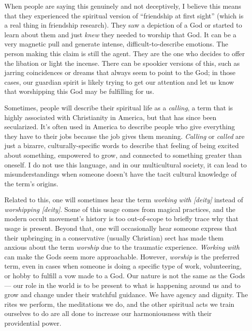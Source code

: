 \documentclass[
]{book}
\begin{document}
When people are saying this genuinely and not deceptively, I believe this means that they experienced the spiritual version of ``friendship at first sight'' (which is a real thing in friendship research). They saw a depiction of a God or started to learn about them and just \emph{knew} they needed to worship that God. It can be a very magnetic pull and generate intense, difficult-to-describe emotions. The person making this claim is still the agent. They are the one who decides to offer the libation or light the incense. There can be spookier versions of this, such as jarring coincidences or dreams that always seem to point to the God; in those cases, our guardian spirit is likely trying to get our attention and let us know that worshipping this God may be fulfilling for us.

Sometimes, people will describe their spiritual life as a \emph{calling}, a term that is highly associated with Christianity in America, but that has since been secularized. It's often used in America to describe people who give everything they have to their jobs because the job gives them meaning. \emph{Calling} or \emph{called} are just a bizarre, culturally-specific words to describe that feeling of being excited about something, empowered to grow, and connected to something greater than oneself. I do not use this language, and in our multicultural society, it can lead to misunderstandings when someone doesn't have the tacit cultural knowledge of the term's origins.

Related to this, one will sometimes hear the term \emph{working with {[}deity{]}} instead of \emph{worshipping {[}deity{]}}. Some of this usage comes from magical practices, and the modern occult movement's history is too out-of-scope to briefly trace why that usage is present. Beyond that, one will occasionally hear someone express that their upbringing in a conservative (usually Christian) sect has made them anxious about the term \emph{worship} due to the traumatic experience. \emph{Working with} can make the Gods seem more approachable. However, \emph{worship} is the preferred term, even in cases when someone is doing a specific type of work, volunteering, or hobby to fulfill a vow made to a God. Our nature is not the same as the Gods --- our role in the world is to be present to what is happening around us and to grow and change under their watchful guidance. We have agency and dignity. The rites we perform, the meditations we do, and the other spiritual acts we train ourselves to do are all done to increase our harmoniousness with their providential power.
\end{document}
